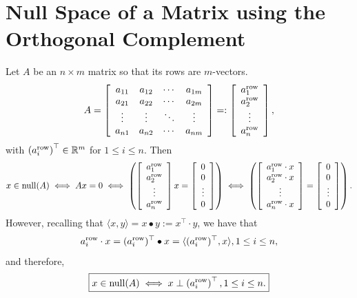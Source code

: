 
\section{Null Space of a Matrix using the Orthogonal Complement}
\label{sec:NullSpaceViaOrthogonalComplement}


\begin{tcolorbox}[title=\textbf{Null Space of $A$ Consists of Vectors Orthogonal to the Rows of $A$}]

Let $A$ be an $n \times m$ matrix so that its rows are $m$-vectors.
$$A=\left[\begin{array}{cccc} a_{11}& a_{12}& \cdots & a_{1m} \\
 a_{21}& a_{22}& \cdots & a_{2m}  \\
 \vdots & \vdots&  \ddots & \vdots \\
 a_{n1}& a_{n2}& \cdots & a_{nm} 
 \end{array}\right] =: \left[\begin{array}{c} a^{\rm row}_1 \\ a^{\rm row}_2 \\ \vdots \\ a^{\rm row}_n \end{array}\right],$$
 with $ \left(a^{\rm row}_i \right)^\top \in \mathbb R^m$ for $1 \le i \le n$. Then
 $$ x \in \mathrm{null}(A) \iff A x = 0 \iff  \left( \left[\begin{array}{c} a^{\rm row}_1 \\ a^{\rm row}_2 \\ \vdots \\ a^{\rm row}_n \end{array}\right] x =  \left[\begin{array}{c} 0 \\ 0 \\ \vdots \\ 0\end{array}\right] \right) \iff  \left( \left[\begin{array}{c} a^{\rm row}_1 \cdot x \\ a^{\rm row}_2 \cdot x \\ \vdots \\ a^{\rm row}_n \cdot x\end{array}\right] =  \left[\begin{array}{c} 0 \\ 0 \\ \vdots \\ 0\end{array}\right] \right). $$
 However, recalling that $\langle x, y \rangle = x \bullet y := x^\top \cdot y$, we have that
 $$a^{\rm row}_i \cdot x = (a^{\rm row}_i)^\top \bullet x = \langle (a^{\rm row}_i)^\top, x \rangle,  1 \le i \le n,$$
 and therefore, 
 $$\boxed{ x \in \mathrm{null}(A) \iff x \perp \left(a^{\rm row}_i \right)^\top, 1 \le i \le n. } $$
 

\end{tcolorbox}
